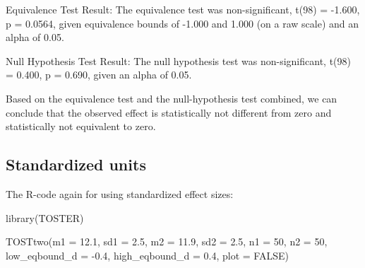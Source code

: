 \documentclass[
]{krantz}
\makeatletter
\newenvironment{Shaded}{\begin{snugshade}}{\end{snugshade}}
\newcommand{\AttributeTok}[1]{\textcolor[rgb]{0.61,0.61,0.61}{#1}}
\newcommand{\ConstantTok}[1]{\textcolor[rgb]{0,0,0}{#1}}
\newcommand{\DecValTok}[1]{\textcolor[rgb]{0.06,0.06,0.06}{#1}}
\newcommand{\FloatTok}[1]{\textcolor[rgb]{0.06,0.06,0.06}{#1}}
\newcommand{\FunctionTok}[1]{\textcolor[rgb]{0,0,0}{#1}}
\newcommand{\NormalTok}[1]{#1}
\newcommand{\OtherTok}[1]{\textcolor[rgb]{0.37,0.37,0.37}{#1}}
\newcommand{\SpecialCharTok}[1]{\textcolor[rgb]{0,0,0}{#1}}
\newenvironment{kframe}{%
\medskip{}
\setlength{\fboxsep}{.8em}
 \def\at@end@of@kframe{}%
 \ifinner\ifhmode%
  \def\at@end@of@kframe{\end{minipage}}%
  \begin{minipage}{\columnwidth}%
 \fi\fi%
 \def\FrameCommand##1{\hskip\@totalleftmargin \hskip-\fboxsep
 \colorbox{shadecolor}{##1}\hskip-\fboxsep
     \hskip-\linewidth \hskip-\@totalleftmargin \hskip\columnwidth}%
 \MakeFramed {\advance\hsize-\width
   \@totalleftmargin\z@ \linewidth\hsize
   \@setminipage}}%
 {\par\unskip\endMakeFramed%
 \at@end@of@kframe}
\renewenvironment{Shaded}{\begin{kframe}}{\end{kframe}}
\makeatother
\begin{document}
\begin{Shaded}
\begin{Highlighting}[]
\NormalTok{Equivalence Test Result}\SpecialCharTok{:}
\NormalTok{The equivalence test was non}\SpecialCharTok{{-}}\NormalTok{significant, }\FunctionTok{t}\NormalTok{(}\DecValTok{98}\NormalTok{) }\OtherTok{=} \SpecialCharTok{{-}}\FloatTok{1.600}\NormalTok{, p }\OtherTok{=} \FloatTok{0.0564}\NormalTok{, }
\NormalTok{given equivalence bounds of }\SpecialCharTok{{-}}\FloatTok{1.000}\NormalTok{ and }\FloatTok{1.000}\NormalTok{ (on a raw scale) and an alpha of }\DecValTok{0}\NormalTok{.}\FloatTok{05.}

\NormalTok{Null Hypothesis Test Result}\SpecialCharTok{:}
\NormalTok{The null hypothesis test was non}\SpecialCharTok{{-}}\NormalTok{significant, }
\FunctionTok{t}\NormalTok{(}\DecValTok{98}\NormalTok{) }\OtherTok{=} \FloatTok{0.400}\NormalTok{, p }\OtherTok{=} \FloatTok{0.690}\NormalTok{, given an alpha of }\DecValTok{0}\NormalTok{.}\FloatTok{05.}

\NormalTok{Based on the equivalence test and the null}\SpecialCharTok{{-}}\NormalTok{hypothesis test combined,}
\NormalTok{we can conclude that the observed effect is statistically not different}
\NormalTok{from zero and statistically not equivalent to zero.}
\end{Highlighting}
\end{Shaded}

\hypertarget{standardized-units-2}{%
\subsection{Standardized units}\label{standardized-units-2}}

The R-code again for using standardized effect sizes:

\begin{Shaded}
\begin{Highlighting}[]
\FunctionTok{library}\NormalTok{(TOSTER)}

\FunctionTok{TOSTtwo}\NormalTok{(}\AttributeTok{m1 =} \FloatTok{12.1}\NormalTok{,}
        \AttributeTok{sd1 =} \FloatTok{2.5}\NormalTok{,}
        \AttributeTok{m2 =} \FloatTok{11.9}\NormalTok{,}
        \AttributeTok{sd2 =} \FloatTok{2.5}\NormalTok{,}
        \AttributeTok{n1 =} \DecValTok{50}\NormalTok{,}
        \AttributeTok{n2 =} \DecValTok{50}\NormalTok{,}
        \AttributeTok{low\_eqbound\_d =} \SpecialCharTok{{-}}\FloatTok{0.4}\NormalTok{,}
        \AttributeTok{high\_eqbound\_d =} \FloatTok{0.4}\NormalTok{,}
        \AttributeTok{plot =} \ConstantTok{FALSE}\NormalTok{)}
\end{Highlighting}
\end{Shaded}
\end{document}
